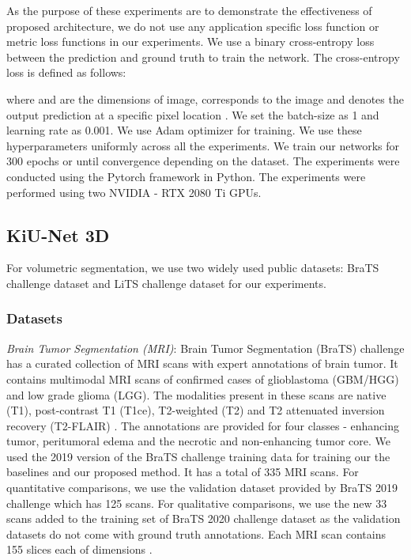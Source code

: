 \documentclass[journal,twoside,web]{ieeecolor}
\begin{document}
As the purpose of these experiments are to demonstrate the effectiveness of  proposed architecture, we do not use any application specific loss function or metric loss functions in our experiments. We use a binary cross-entropy loss between the prediction and ground truth to train the network.  The cross-entropy loss is defined as follows:

\setlength{\belowdisplayskip}{0pt} \setlength{\belowdisplayshortskip}{0pt}
\setlength{\abovedisplayskip}{0pt} \setlength{\abovedisplayshortskip}{0pt}



where  and  are the dimensions of image,   corresponds to the image and   denotes the output prediction at a specific pixel location . We set the batch-size as 1 and learning rate as 0.001. We use Adam optimizer for training.   We use these hyperparameters uniformly across all the experiments. We train our networks for 300 epochs or until convergence depending on the dataset. The experiments were conducted using the Pytorch framework in Python. The experiments were performed using two NVIDIA - RTX 2080 Ti GPUs.




\subsection{KiU-Net 3D}

For volumetric segmentation, we use two widely used public datasets: BraTS challenge dataset and LiTS challenge dataset for our experiments.

\subsubsection{Datasets}

\noindent\textit{Brain Tumor Segmentation (MRI)}: Brain Tumor Segmentation (BraTS) challenge has a curated collection of MRI scans with expert annotations of brain tumor. It contains multimodal MRI scans of confirmed cases of glioblastoma (GBM/HGG) and low grade glioma (LGG). The modalities present in these scans are native (T1), post-contrast T1 (T1ce), T2-weighted (T2) and T2 attenuated inversion recovery (T2-FLAIR) \cite{menze2014multimodal,bakas2017advancing,bakas2018identifying}. The annotations are provided for four classes - enhancing tumor, peritumoral edema and the necrotic and non-enhancing tumor core. We used the 2019 version of the BraTS challenge training data for training our the baselines and our proposed method. It has a total of 335 MRI scans. For quantitative comparisons, we use the validation dataset provided by BraTS 2019 challenge which has 125 scans. For qualitative comparisons, we use the new 33 scans added to the  training set of BraTS 2020 challenge dataset as the validation datasets do not come with ground truth annotations. Each MRI scan contains 155 slices each of dimensions .  \\
\end{document}
